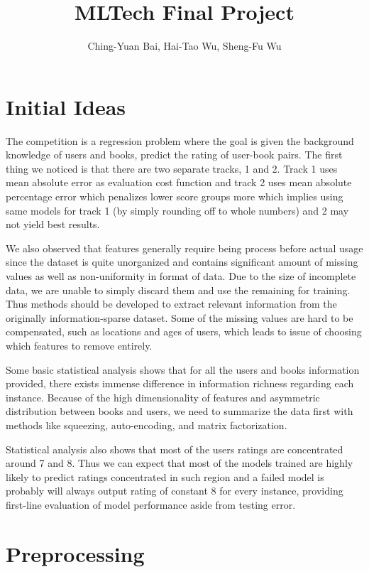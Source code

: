 \documentclass{article}
\title{MLTech Final Project}
\author{Ching-Yuan Bai, Hai-Tao Wu, Sheng-Fu Wu}
\begin{document}
\maketitle

\section{Initial Ideas}
The competition is a regression problem where the goal is given the background knowledge of users and books, predict the rating of user-book pairs. The first thing we noticed is that there are two separate tracks, 1 and 2. Track 1 uses mean absolute error as evaluation cost function and track 2 uses mean absolute percentage error which penalizes lower score groups more which implies using same models for track 1 (by simply rounding off to whole numbers) and 2 may not yield best results.

We also observed that features generally require being process before actual usage since the dataset is quite unorganized and contains significant amount of missing values as well as non-uniformity in format of data. Due to the size of incomplete data, we are unable to simply discard them and use the remaining for training. Thus methods should be developed to extract relevant information from the originally information-sparse dataset. Some of the missing values are hard to be compensated, such as locations and ages of users, which leads to issue of choosing which features to remove entirely. 


Some basic statistical analysis shows that for all the users and books information provided, there exists immense difference in information richness regarding each instance. 
Because of the high dimensionality of features and asymmetric distribution between books and users, we need to summarize the data first with methods like squeezing, auto-encoding, and matrix factorization.


Statistical analysis also shows that most of the users ratings are concentrated around 7 and 8. Thus we can expect that most of the models trained are highly likely to predict ratings concentrated in such region and a failed model is probably will always output rating of constant 8 for every instance, providing first-line evaluation of model performance aside from testing error.

\section{Preprocessing}
\end{document}
